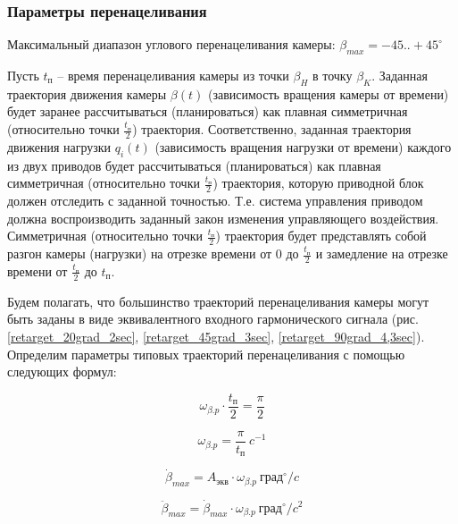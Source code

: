 \newpage
\subsubsection{Параметры перенацеливания}

Максимальный диапазон углового перенацеливания камеры:
$\beta_{max} = -45..+45^{\circ}$

Пусть $t_\text{п}$ – время перенацеливания камеры из точки $\beta_{H}$ в точку $\beta_{K}$.
Заданная траектория движения камеры $\beta(t)$ (зависимость вращения камеры от времени)
будет заранее рассчитываться (планироваться) как плавная симметричная
(относительно точки $\frac{t_\text{п} }{2}$) траектория.
Соответственно, заданная траектория движения нагрузки $q_{i}(t)$
(зависимость вращения нагрузки от времени) каждого из двух приводов будет рассчитываться
(планироваться) как плавная симметричная (относительно точки $\frac{t_\text{п} }{2}$)
траектория, которую приводной блок должен отследить с заданной точностью.
Т.е. система управления приводом должна воспроизводить заданный закон изменения управляющего
воздействия.
Симметричная (относительно точки $\frac{t_\text{п} }{2}$) траектория будет представлять
собой разгон камеры (нагрузки) на отрезке времени от 0 до $\frac{t_\text{п} }{2}$
и замедление на отрезке времени от $\frac{t_\text{п} }{2}$ до $t_\text{п}$.

Будем полагать, что большинство траекторий перенацеливания камеры могут быть заданы
в виде эквивалентного входного гармонического сигнала
(рис. \ref{retarget_20grad_2sec},
\ref{retarget_45grad_3sec},
\ref{retarget_90grad_4,3sec}).
Определим параметры типовых траекторий перенацеливания с помощью следующих формул:

\begin{equation}
    \label{retarget_angle}
    \omega_{\beta.p} \cdot \frac{t_\text{п} }{2} = \frac{\pi}{2}
\end{equation}

\begin{equation}
    \label{equiv_signal_frequency}
    \omega_{\beta.p} = \frac{\pi}{t_\text{п} } ~c^{-1}
\end{equation}

\begin{equation}
    \label{max_speed_for_equiv_signal}
    \dot{\beta}_{max} = A_\text{экв} \cdot \omega_{\beta.p} ~\text{град}^{\circ} / c
\end{equation}

\begin{equation}
    \label{max_acceleration_for_equiv_signal}
    \ddot{\beta}_{max} = \dot{\beta}_{max} \cdot \omega_{\beta.p} ~\text{град}^{\circ} / c^{2}
\end{equation}


